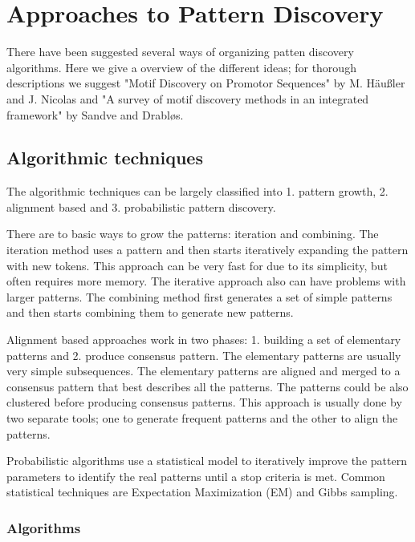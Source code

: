 \chapter{Approaches to Pattern Discovery}
\label{c:algorithms}

There have been suggested several ways of organizing patten discovery algorithms\cite{SurveyDNAMotif, SurveyMotifDiscovery, CombinatorialSubtle, Hausler05}. Here we give a overview of the different ideas; for thorough descriptions we suggest "Motif Discovery on Promotor Sequences" by M. Häußler and J. Nicolas\cite{Hausler05} and "A survey of motif discovery methods in an integrated framework" by Sandve and Drabløs\cite{SurveyMotifDiscovery}.

\section{Algorithmic techniques}

The algorithmic techniques can be largely classified into 1. pattern growth, 2. alignment based and 3. probabilistic pattern discovery.

There are to basic ways to grow the patterns: iteration and combining. The iteration method uses a pattern and then starts iteratively expanding the pattern with new tokens. This approach can be very fast for due to its simplicity, but often requires more memory. The iterative approach also can have problems with larger patterns. The combining method first generates a set of simple patterns and then starts combining them to generate new patterns.

Alignment based approaches work in two phases: 1. building a set of elementary patterns and 2. produce consensus pattern. The elementary patterns are usually very simple subsequences. The elementary patterns are aligned and merged to a consensus pattern that best describes all the patterns. The patterns could be also clustered before producing consensus patterns. This approach is usually done by two separate tools; one to generate frequent patterns and the other to align the patterns.

Probabilistic algorithms use a statistical model to iteratively improve the pattern parameters to identify the real patterns until a stop criteria is met. Common statistical techniques are Expectation Maximization (EM) and Gibbs sampling.

\subsection{Algorithms}


